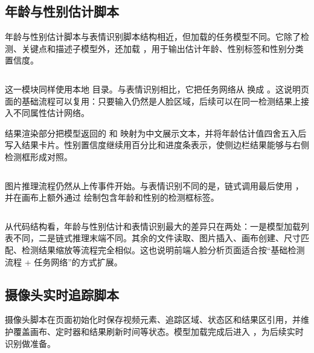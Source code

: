 \subsection*{年龄与性别估计脚本}

年龄与性别估计脚本与表情识别脚本结构相近，但加载的任务模型不同。它除了检测、关键点和描述子模型外，还加载 ，用于输出估计年龄、性别标签和性别分类置信度。

\inputminted[firstline=1,lastline=17,firstnumber=1]{javascript}{code/face-recognition/dist/estimation_script.js}

这一模块同样使用本地  目录。与表情识别相比，它把任务网络从  换成 。这说明页面的基础流程可以复用：只要输入仍然是人脸区域，后续可以在同一检测结果上接入不同属性估计网络。

结果渲染部分把模型返回的  和  映射为中文展示文本，并将年龄估计值四舍五入后写入结果卡片。性别置信度继续用百分比和进度条表示，使侧边栏结果能够与右侧检测框形成对照。

\inputminted[firstline=38,lastline=91,firstnumber=38]{javascript}{code/face-recognition/dist/estimation_script.js}

图片推理流程仍然从上传事件开始。与表情识别不同的是，链式调用最后使用 ，并在画布上额外通过  绘制包含年龄和性别的检测框标签。

\inputminted[firstline=93,lastline=145,firstnumber=93]{javascript}{code/face-recognition/dist/estimation_script.js}

从代码结构看，年龄与性别估计和表情识别最大的差异只在两处：一是模型加载列表不同，二是链式推理末端不同。其余的文件读取、图片插入、画布创建、尺寸匹配、检测结果缩放等流程完全相似。这也说明前端人脸分析页面适合按“基础检测流程 + 任务网络”的方式扩展。

\subsection*{摄像头实时追踪脚本}

摄像头脚本在页面初始化时保存视频元素、追踪区域、状态区和结果区引用，并维护覆盖画布、定时器和结果刷新时间等状态。模型加载完成后进入 ，为后续实时识别做准备。

\inputminted[firstline=1,lastline=49,firstnumber=1]{javascript}{code/face-recognition/dist/webcam_script.js}

